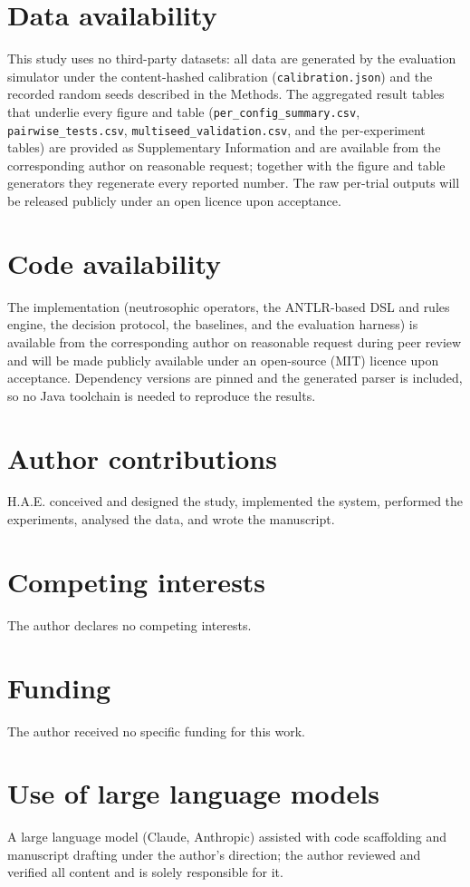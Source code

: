 \documentclass[11pt]{article}
\begin{document}
\section*{Data availability}
This study uses no third-party datasets: all data are generated by the evaluation simulator under the
content-hashed calibration (\texttt{calibration.json}) and the recorded random seeds described in the
Methods. The aggregated result tables that underlie every figure and table
(\texttt{per\_config\_summary.csv}, \texttt{pairwise\_tests.csv}, \texttt{multiseed\_validation.csv}, and
the per-experiment tables) are provided as Supplementary Information and are available from the
corresponding author on reasonable request; together with the figure and table generators they regenerate
every reported number. The raw per-trial outputs will be released publicly under an open licence upon
acceptance.

\section*{Code availability}
The implementation (neutrosophic operators, the ANTLR-based DSL and rules engine, the decision protocol,
the baselines, and the evaluation harness) is available from the corresponding author on reasonable
request during peer review and will be made publicly available under an open-source (MIT) licence upon
acceptance. Dependency versions are pinned and the generated parser is included, so no Java toolchain is
needed to reproduce the results.

\section*{Author contributions}
H.A.E. conceived and designed the study, implemented the system, performed the experiments, analysed the
data, and wrote the manuscript.

\section*{Competing interests}
The author declares no competing interests.

\section*{Funding}
The author received no specific funding for this work.

\section*{Use of large language models}
A large language model (Claude, Anthropic) assisted with code scaffolding and manuscript drafting under
the author's direction; the author reviewed and verified all content and is solely responsible for it.



\end{document}
